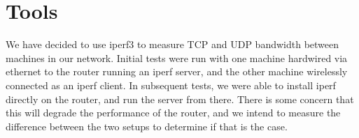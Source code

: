 \section{Tools}

We have decided to use iperf3 to measure TCP and UDP bandwidth between machines
in our network. Initial tests were run with one machine hardwired via ethernet
to the router running an iperf server, and the other machine wirelessly
connected as an iperf client. In subsequent tests, we were able to install iperf
directly on the router, and run the server from there. There is some concern
that this will degrade the performance of the router, and we intend to measure
the difference between the two setups to determine if that is the case.
